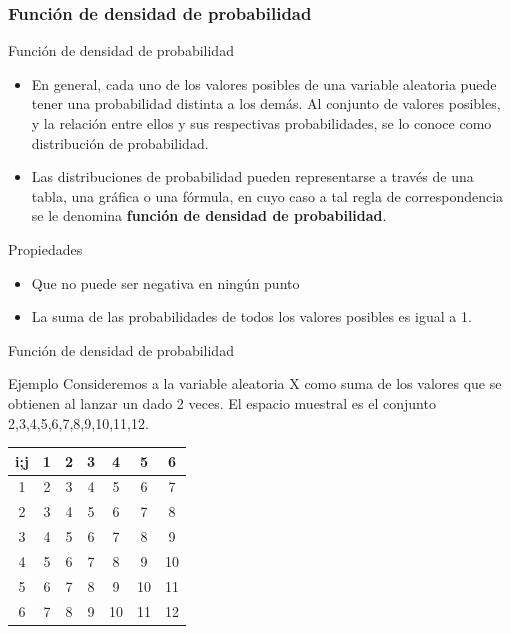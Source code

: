 \documentclass[11pt]{beamer}
\begin{document}
        \subsubsection*{Función de densidad de probabilidad}
        \begin{frame}{Función de densidad de probabilidad}
            \begin{itemize}
                \item En general, cada uno de los valores posibles de una variable aleatoria puede tener una probabilidad distinta a los demás. Al conjunto de valores posibles, y la relación entre ellos y sus respectivas probabilidades, se lo conoce como distribución de probabilidad.
                \item Las distribuciones de probabilidad pueden representarse a través de una tabla, una gráfica o una fórmula, en cuyo caso a tal regla de correspondencia se le denomina \textbf{función de densidad de probabilidad}.
            \end{itemize}
            \begin{block}{Propiedades}
                \begin{itemize}
                    \item Que no puede ser negativa en ningún punto
                    \item La suma de las probabilidades de todos los valores posibles es igual a 1.
                \end{itemize}
            \end{block}
        \end{frame}

        \begin{frame}{Función de densidad de probabilidad}
          \begin{block}{Ejemplo}
             Consideremos a la variable aleatoria X como suma de los valores que se obtienen al lanzar un dado 2 veces. El espacio muestral es el conjunto {2,3,4,5,6,7,8,9,10,11,12}.
          \end{block}
          \pause
          \begin{center}
              \begin{tabular}{c|cccccc}
                 i;j & 1 & 2 & 3 & 4 & 5 & 6 \\
                  \hline
                  1 & 2 & 3 & 4 & 5 & 6 & 7 \\
                  2 & 3 & 4 & 5 & 6 & 7 & 8 \\
                  3 & 4 & 5 & 6 & 7 & 8 & 9 \\
                  4 & 5 & 6 & 7 & 8 & 9 & 10 \\
                  5 & 6 & 7 & 8 & 9 & 10 & 11 \\
                  6 & 7 & 8 & 9 & 10 & 11 & 12 \\
              \end{tabular}
          \end{center}
        \end{frame}
\end{document}
